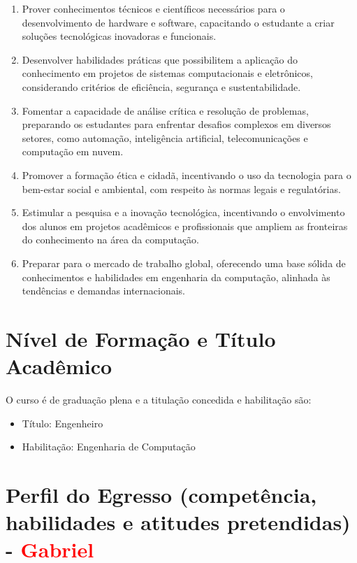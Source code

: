 \begin{enumerate}
	\item Prover conhecimentos técnicos e científicos necessários para o desenvolvimento de hardware e software, capacitando o estudante a criar soluções tecnológicas inovadoras e funcionais.

	\item Desenvolver habilidades práticas que possibilitem a aplicação do conhecimento em projetos de sistemas computacionais e eletrônicos, considerando critérios de eficiência, segurança e sustentabilidade.

	\item Fomentar a capacidade de análise crítica e resolução de problemas, preparando os estudantes para enfrentar desafios complexos em diversos setores, como automação, inteligência artificial, telecomunicações e computação em nuvem.

	\item Promover a formação ética e cidadã, incentivando o uso da tecnologia para o bem-estar social e ambiental, com respeito às normas legais e regulatórias.

	\item Estimular a pesquisa e a inovação tecnológica, incentivando o envolvimento dos alunos em projetos acadêmicos e profissionais que ampliem as fronteiras do conhecimento na área da computação.

	\item Preparar para o mercado de trabalho global, oferecendo uma base sólida de conhecimentos e habilidades em engenharia da computação, alinhada às tendências e demandas internacionais.

\end{enumerate}

\section{Nível de Formação e Título Acadêmico}

O curso é de graduação plena e a titulação concedida e habilitação são:

\begin{itemize}
	\item{Título: Engenheiro}
	\item{Habilitação: Engenharia de Computação}
\end{itemize}

\section{Perfil do Egresso (competência, habilidades e atitudes pretendidas) - \textcolor{red}{Gabriel}}

